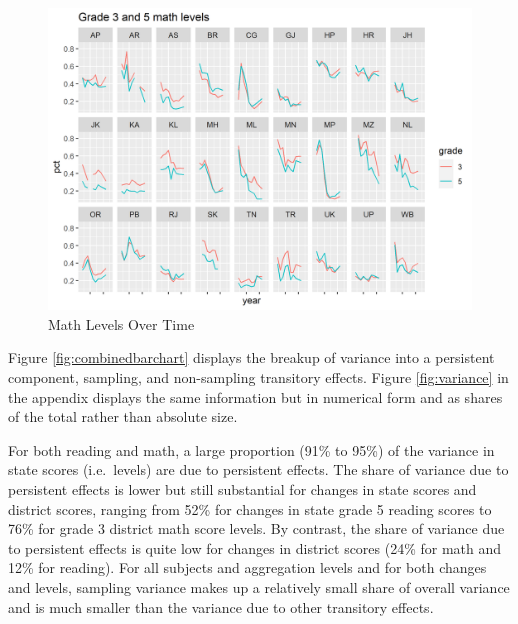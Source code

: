 \documentclass[
  11pt,
]{article}
\begin{document}
\begin{figure}

{\centering \includegraphics[width=0.8\linewidth]{aser math over time} 

}

\caption{Math Levels Over Time}\label{fig:asermath}
\end{figure}

Figure \ref{fig:combinedbarchart} displays the breakup of variance into a persistent component, sampling, and non-sampling transitory effects. Figure \ref{fig:variance} in the appendix displays the same information but in numerical form and as shares of the total rather than absolute size.

For both reading and math, a large proportion (91\% to 95\%) of the variance in state scores (i.e.~levels) are due to persistent effects. The share of variance due to persistent effects is lower but still substantial for changes in state scores and district scores, ranging from 52\% for changes in state grade 5 reading scores to 76\% for grade 3 district math score levels. By contrast, the share of variance due to persistent effects is quite low for changes in district scores (24\% for math and 12\% for reading). For all subjects and aggregation levels and for both changes and levels, sampling variance makes up a relatively small share of overall variance and is much smaller than the variance due to other transitory effects.
\end{document}
